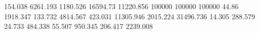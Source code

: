 154.038    6261.193   %
1180.526   16594.73   %
11220.856  100000     %
100000     100000     %
44.86      1918.347   %
133.732    4814.567   %
423.031    11305.946  %
2015.224   31496.736  %
14.305     288.579    %
24.733     484.338    %
55.507     950.345    %
206.417    2239.008   %

